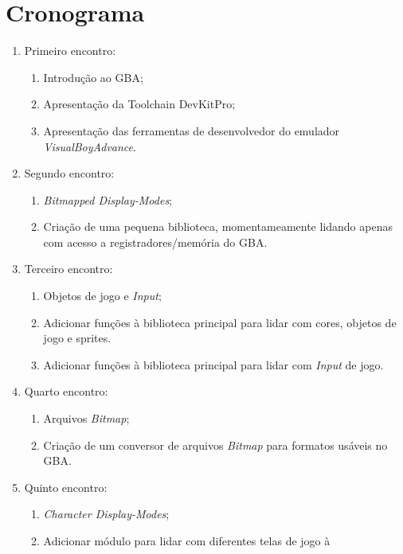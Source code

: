 \documentclass{article}
\begin{document}
\section{Cronograma}

\begin{enumerate}[label= (\alph*)]
    \item Primeiro encontro:
        \begin{enumerate}
            \item Introdução ao GBA\@;
            \item Apresentação da Toolchain DevKitPro;
            \item Apresentação das ferramentas de desenvolvedor do emulador
                \textit{VisualBoyAdvance}.
        \end{enumerate}
    \item Segundo encontro:
        \begin{enumerate}
            \item \textit{Bitmapped Display-Modes};
            \item Criação de uma pequena biblioteca, momentameamente lidando
                apenas com acesso a registradores/memória do GBA\@.
        \end{enumerate}
    \item Terceiro encontro:
        \begin{enumerate}
            \item Objetos de jogo e \textit{Input};
            \item Adicionar funções à biblioteca principal para lidar com
                cores, objetos de jogo e sprites.
            \item Adicionar funções à biblioteca principal para lidar com
                \textit{Input} de jogo.
        \end{enumerate}
    \item Quarto encontro:
        \begin{enumerate}
            \item Arquivos \textit{Bitmap};
            \item Criação de um conversor de arquivos \textit{Bitmap} para
                formatos usáveis no GBA\@.
        \end{enumerate}
    \item Quinto encontro:
        \begin{enumerate}
            \item \textit{Character Display-Modes};
            \item Adicionar módulo para lidar com diferentes telas de jogo à

\end{enumerate}
\end{enumerate}
\end{document}
